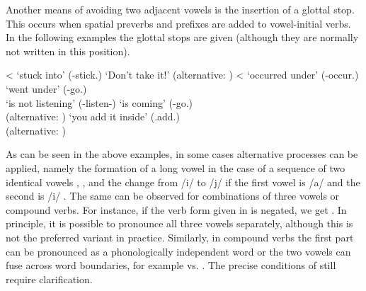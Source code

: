 Another means of avoiding two adjacent vowels is the insertion of a glottal stop. This occurs when spatial preverbs and  prefixes are added to vowel-initial verbs. In the following examples the glottal stops are given (although they are normally not written in this position).
%
\begin{exe}
	\ex	\label{ex:glottal stop inversion phon}
	\begin{xlist}
		\TabPositions{3em}
		\ex	{}	\tab	{} <  `stuck into' (-stick.)
		\ex	\label{Don't take it!Phon}  	\tab	{} `Don't take it!'	(alternative: )	
		\ex	{}	\tab	{} <  	`occurred under' (-occur.)
		\ex	{}	\tab	{}	`went under' (-go.)\\
		\tab \tab {} `is not listening' (-listen-)
		\ex	\label{hitherGOPHON}  	\tab	{} `is coming' (-go.)\\ 
		\tab \tab (alternative: )	
		\ex	{}	\tab	{} 	
		\ex	\label{insideADDPHON} 	\tab	{} `you add it inside' (.add.)\\
		\tab \tab (alternative: )	
	\end{xlist}
\end{exe}

As can be seen in the above examples, in some cases alternative processes can be applied, namely the formation of a long vowel in the case of a sequence of two identical vowels , , and the change from /i/ to /j/ if the first vowel is /a/ and the second is /i/ . The same can be observed for combinations of three vowels or compound verbs. For instance, if the verb form  given in  is negated, we get . In principle, it is possible to pronounce all three vowels separately, although this is not the preferred variant in practice. Similarly, in compound verbs the first part can be pronounced as a phonologically independent word or the two vowels can fuse across word boundaries, for example  vs.  . The precise conditions of  still require clarification.


